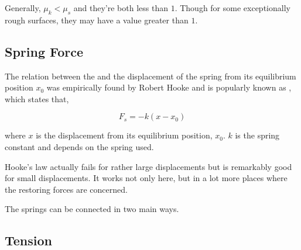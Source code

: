 Generally, \(\mu_k < \mu_s\) and they're both less than \(1\). Though for some exceptionally rough surfaces, they
may have a value greater than \(1\).

\subsection{Spring Force}

The relation between the  and the displacement of the spring
from its equilibrium position \(x_0\) was empirically found by Robert Hooke and is popularly 
known as , which states that,

\begin{equation}
    F_s = -k(x - x_0)
\end{equation}

where \(x\) is the displacement from its equilibrium position, \(x_0\). \(k\) is the
spring constant and depends on the spring used. 

Hooke's law actually fails for rather large displacements but is remarkably good for 
small displacements. It works not only here, but in a lot more places where the restoring forces 
are concerned.

The springs can be connected in two main ways.

\subsection{Tension}
